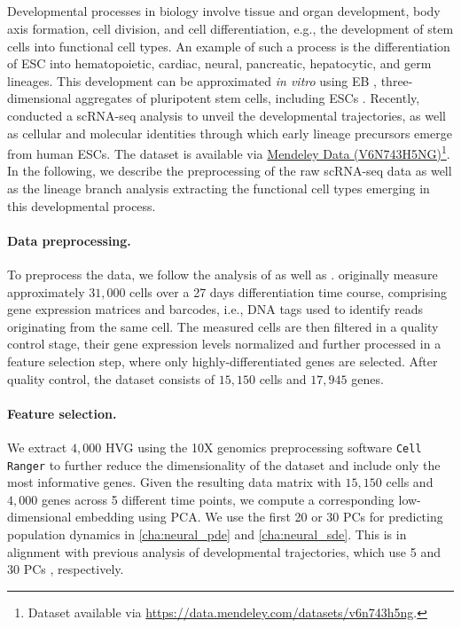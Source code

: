 \subsection{\citet{moon2019visualizing}}
\label{app:dataset_moon}

Developmental processes in biology involve tissue and organ development, body axis formation, cell division, and cell differentiation, e.g., the development of stem cells into functional cell types.
An example of such a process is the differentiation of \acrshort{ESC} into  hematopoietic, cardiac, neural, pancreatic, hepatocytic, and germ lineages.
This development can be approximated \textit{in vitro} using \acrfull{EB} \citep{martin1975differentiation}, three-dimensional aggregates of pluripotent stem cells, including ESCs \citep{shamblott2009derivation}.
Recently, \citet{moon2019visualizing} conducted a scRNA-seq analysis to unveil the developmental trajectories, as well as cellular and molecular identities through which early lineage precursors emerge from human ESCs.
The dataset is available via \href{https://data.mendeley.com/datasets/v6n743h5ng}{Mendeley Data (V6N743H5NG)}\footnote{Dataset available via \url{https://data.mendeley.com/datasets/v6n743h5ng}.}.
In the following, we describe the preprocessing of the raw scRNA-seq data as well as the lineage branch analysis extracting the functional cell types emerging in this developmental process.

\paragraph{Data preprocessing.}
To preprocess the data, we follow the analysis of \citet{moon2019visualizing} as well as \citet{luecken2019current}. \citet{moon2019visualizing} originally measure  approximately $31,000$ cells over a 27 days differentiation time course, comprising gene expression matrices and barcodes, i.e., DNA tags used to identify reads originating from the same cell. The measured cells are then filtered in a quality control stage, their gene expression levels normalized and further processed in a feature selection step, where only highly-differentiated genes are selected.
After quality control, the dataset consists of $15,150$ cells and $17,945$ genes.

\paragraph{Feature selection.}
We extract $4,000$ \acrfull{HVG} using the 10X genomics preprocessing software \texttt{Cell Ranger} \citep{zheng2017massively} to further reduce the dimensionality of the dataset and include only the most informative genes.
Given the resulting data matrix with $15,150$ cells and $4,000$ genes across 5 different time points, we compute a corresponding low-dimensional embedding using PCA. We use the first 20 or 30 PCs for predicting population dynamics in \cref{cha:neural_pde} and \ref{cha:neural_sde}.
This is in alignment with previous analysis of developmental trajectories, which use 5 \citep{tong2020trajectorynet} and 30 PCs \citep{schiebinger2019optimal}, respectively.

